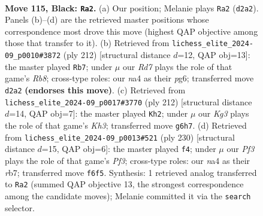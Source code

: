 \documentclass[11pt]{article}
\begin{document}
\clearpage

\begin{figure}[p]\centering
\begin{subfigure}{0.46\textwidth}\centering
\resizebox{\linewidth}{!}{%
\newchessgame
\chessboard[
  setfen={5R2/6p1/5pk1/7p/N6P/6PK/3r4/8 b - - 55 115},
  showmover=false,
  pgfstyle=straightmove, color=movearrow, markmove={d2-a2}
]}
\caption{}
\end{subfigure}\hfill
\begin{subfigure}{0.46\textwidth}\centering
\resizebox{\linewidth}{!}{%
\newchessgame
\chessboard[
  setfen={1R6/5pk1/6p1/4P2p/5K1P/5PP1/8/4r3 w - - 5 107},
  showmover=false,
  pgfstyle=straightmove, color=movearrow, markmove={b8-b7}
]}
\caption{}
\end{subfigure}
\\[4pt]
\begin{subfigure}{0.46\textwidth}\centering
\resizebox{\linewidth}{!}{%
\newchessgame
\chessboard[
  setfen={8/1R6/6pk/7p/7P/6PK/8/3r4 w - - 50 107},
  showmover=false,
  pgfstyle=straightmove, color=movearrow, markmove={h3-h2}
]}
\caption{}
\end{subfigure}\hfill
\begin{subfigure}{0.46\textwidth}\centering
\resizebox{\linewidth}{!}{%
\newchessgame
\chessboard[
  setfen={8/1r6/6pk/7p/R6P/5PP1/5K2/8 w - - 41 116},
  showmover=false,
  pgfstyle=straightmove, color=movearrow, markmove={f3-f4}
]}
\caption{}
\end{subfigure}
\caption{\textbf{Move 115, Black: \texttt{Ra2}.} (a) Our position; Melanie plays \texttt{Ra2} (\texttt{d2a2}). Panels (b)--(d) are the retrieved master positions whose correspondence most drove this move (highest QAP objective among those that transfer to it). (b) Retrieved from \texttt{lichess\_elite\_2024-09\_p0010\#3872} (ply 212) [structural distance $d$=12, QAP obj=13]: the master played \texttt{Rb7}; under $\mu$ our \emph{Rd7} plays the role of that game's \emph{Rb8}; cross-type roles: our \emph{n}a4 as their \emph{p}g6; transferred move \texttt{d2a2} \textbf{(endorses this move)}. (c) Retrieved from \texttt{lichess\_elite\_2024-09\_p0017\#3770} (ply 212) [structural distance $d$=14, QAP obj=7]: the master played \texttt{Kh2}; under $\mu$ our \emph{Kg3} plays the role of that game's \emph{Kh3}; transferred move \texttt{g6h7}. (d) Retrieved from \texttt{lichess\_elite\_2024-09\_p0013\#521} (ply 230) [structural distance $d$=15, QAP obj=6]: the master played \texttt{f4}; under $\mu$ our \emph{Pf3} plays the role of that game's \emph{Pf3}; cross-type roles: our \emph{n}a4 as their \emph{r}b7; transferred move \texttt{f6f5}. Synthesis: 1 retrieved analog transferred to \texttt{Ra2} (summed QAP objective 13, the strongest correspondence among the candidate moves); Melanie committed it via the \texttt{search} selector.}
\label{fig:thought-m229}
\end{figure}
\end{document}
